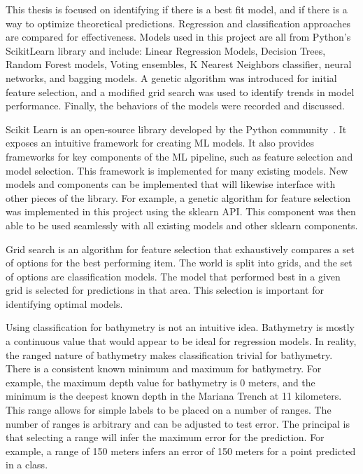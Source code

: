 \par
This thesis is focused on identifying if there is a best fit model, and if there is a way to optimize theoretical predictions.
Regression and classification approaches are compared for effectiveness.
Models used in this project are all from Python's ScikitLearn library and include: Linear Regression Models, Decision Trees, Random Forest models, Voting ensembles, K Nearest Neighbors classifier, neural networks, and bagging models.
A genetic algorithm was introduced for initial feature selection, and a modified grid search was used to identify trends in model performance.
Finally, the behaviors of the models were recorded and discussed.

\par
Scikit Learn is an open-source library developed by the Python community~\cite{scikit-learn}.
It exposes an intuitive framework for creating \ac{ML} models.
It also provides frameworks for key components of the \ac{ML} pipeline, such as feature selection and model selection.
This framework is implemented for many existing models.
New models and components can be implemented that will likewise interface with other pieces of the library.
For example, a genetic algorithm for feature selection was implemented in this project using the sklearn \ac{API}.
This component was then able to be used seamlessly with all existing models and other sklearn components.

\par
Grid search is an algorithm for feature selection that exhaustively compares a set of options for the best performing item.
The world is split into grids, and the set of options are classification models.
The model that performed best in a given grid is selected for predictions in that area.
This selection is important for identifying optimal models.


\par
Using classification for bathymetry is not an intuitive idea.
Bathymetry is mostly a continuous value that would appear to be ideal for regression models.
In reality, the ranged nature of bathymetry makes classification trivial for bathymetry.
There is a consistent known minimum and maximum for bathymetry.
For example, the maximum depth value for bathymetry is 0 meters, and the minimum is the deepest known depth in the Mariana Trench at 11 kilometers.
This range allows for simple labels to be placed on a number of ranges.
The number of ranges is arbitrary and can be adjusted to test error.
The principal is that selecting a range will infer the maximum error for the prediction.
For example, a range of 150 meters infers an error of 150 meters for a point predicted in a class.




